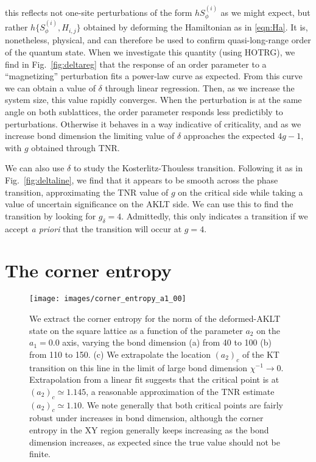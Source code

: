 \documentclass[aps,prb,letterpaper,superscriptaddress,twocolumn,showpacs,floatfix,10pt]{revtex4-1}
\begin{document}
this reflects not one-site perturbations of the form $hS^{(i)}_\phi$ as we
might expect, but rather $h\{S^{(i)}_\phi,H_{i,j}\}$ obtained by deforming
the Hamiltonian as in \eqref{eqn:Ha}. It is, nonetheless, physical, and can
therefore be used to confirm quasi-long-range order of the quantum state.
When we investigate this quantity (using HOTRG),
we find in Fig.~\ref{fig:deltareg} that the
response of an order parameter to a ``magnetizing'' perturbation fits a
power-law curve as expected. From this curve we can obtain a value of $\delta$
through linear regression. Then, as we increase the system size, this value
rapidly converges.  When the perturbation
is at the same angle on both sublattices, the order parameter
responds less predictibly to perturbations. Otherwise it behaves in a
way indicative of
criticality, and as we increase bond dimension the limiting value of $\delta$
approaches the expected $4g-1$, with $g$ obtained through TNR.

We can also use $\delta$ to study the Kosterlitz-Thouless transition.
Following it as in Fig.~\ref{fig:deltaline},
we find that it appears to be smooth across the phase transition, approximating
the TNR value of $g$ on the critical side while taking a value of uncertain
significance on the AKLT side. We can use this to find the transition by looking
for $g_\delta=4$. Admittedly, this only indicates a transition if we accept
\textit{a priori} that the transition will occur at $g=4$.

\section{ The corner entropy}
\label{app:corner}

\begin{figure}
\texttt{[image: images/corner\_entropy\_a1\_00]}
\caption{
We extract the corner entropy for the norm of the deformed-AKLT state on the
square lattice as a function of the parameter $a_2$ on the $a_1=0.0$  axis,
varying the bond dimension (a) from 40 to 100  (b) from  110 to 150. 
(c)  We extrapolate the location $(a_2)_c$ of the KT transition on this line
in the limit of large bond dimension $\chi^{-1} \to 0$.
Extrapolation from a linear fit suggests that the critical point is at
$(a_2)_c \simeq 1.145$, a reasonable approximation of the TNR estimate
$(a_2)_c \simeq 1.10$. We note generally that both
critical points are fairly robust under increases in bond dimension, although
the corner entropy in the XY region generally keeps increasing
as the bond dimension increases, as expected since the true value
should not be finite.}
\label{fig:corner_entropy_a1_00}
\end{figure}
\end{document}
